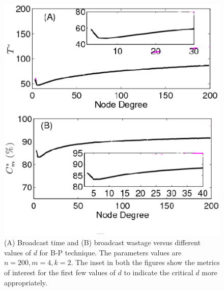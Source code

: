 \begin{figure}
\centering
\includegraphics[scale=0.39]{./texfiles/Chapter_3/netsci/figs1/DiffTopology_varyN200_varyD_push_pullRes_m4_k21.eps}
\caption{(A) Broadcast time and (B) broadcast wastage versus different values of $d$ for B-P technique. The parameters values are $n=200, m=4, k=2$. The inset in both the figures show the metrics of interest for the first few values of $d$ to indicate the critical $d$ more appropriately.\vspace{-3mm}}
\label{DiffTopologyGraph_N200_varyD_push_pull}
\end{figure}

